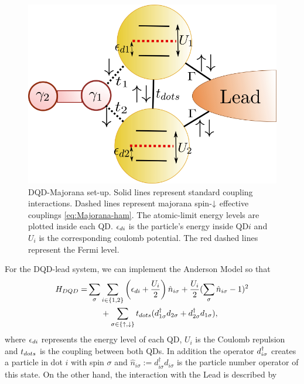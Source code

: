\documentclass[showpacs,aps,prb,reprint,superscriptaddress]{revtex4-1}
\begin{document}
\begin{figure}[bt]
\begin{center}
\includegraphics[scale=0.4]{Graficos/Model.png}
\caption{ DQD-Majorana set-up. Solid lines represent standard coupling interactions. Dashed lines represent majorana spin-$\downarrow$ effective couplings \eqref{eq:Majorana-ham}. The atomic-limit energy levels are plotted inside each QD. $\epsilon_{di}$ is the particle's energy inside QD$i$ and $U_i$ is the corresponding coulomb potential. The red dashed lines represent the Fermi level.  
}
%
\label{fig:GenModel}
\end{center}
\end{figure}


For the DQD-lead system, we can implement the Anderson Model so that 
\begin{align*}
H_{DQD}=& \sum_{\sigma} \sum_{i\in\{1,2\}}\left(\epsilon_{di}+\frac{U_i}{2}\right)\hat{n}_{i\sigma}+ \frac{U_i}{2}(\sum_{\sigma} \hat{n}_{i\sigma}-1)^{2} \\
&\ \ \ \ \ + \sum_{\sigma \in \{\uparrow , \downarrow\}} t_{dots}(d^{\dagger}_{1\sigma}  d_{2\sigma}+d^{\dagger}_{2\sigma}  d_{1\sigma}),
\end{align*}
%
where $\epsilon_{di}$ represents the energy level of each QD, $U_i$ is the Coulomb repulsion and $t_{dots}$ is the coupling between both QDs. In addition the operator $d^{\dagger}_{i\sigma}$ creates a particle in dot $i$ with spin $\sigma$ and $\hat{n}_{i\sigma}:=d_{i\sigma}^{\dagger}d_{i\sigma}$ is the particle number operator of this state. On the other hand, the interaction with the Lead is described by 
\end{document}
